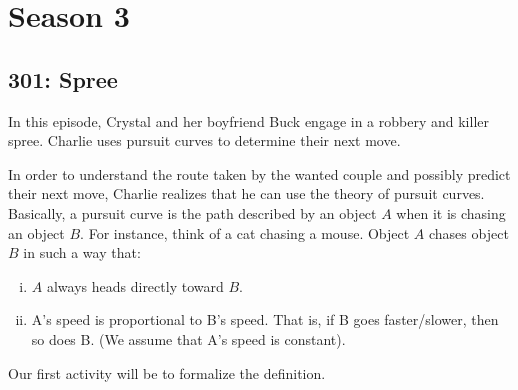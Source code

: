 \newpage
\section{Season 3}
\subsection{301: Spree\label{301}}

In this episode, Crystal and her boyfriend Buck engage in a robbery and killer spree. Charlie uses pursuit curves to determine their next move.


In order to understand the route taken by the wanted couple and possibly predict their next move, Charlie realizes that he can use the theory of pursuit curves. Basically, a pursuit curve is the path described by an object $A$ when it is chasing an object $B$. For instance, think of a cat chasing a mouse. Object $A$ chases object $B$ in such a way that:
	\begin{enumerate}[(i)]
	\item $A$ always heads directly toward $B$.
	\item A's speed is proportional to B's speed. That is, if B goes faster/slower, then so does B. (We assume that A's speed is constant).
	\end{enumerate}
Our first activity will be to formalize the definition. \\

 \vspace{0.2cm}


